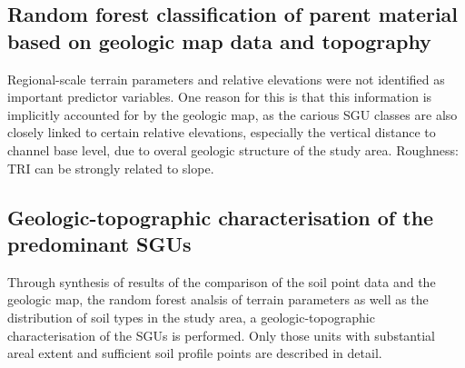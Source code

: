 \documentclass[preprint,12pt,authoryear]{elsarticle}
\begin{document}
\subsection{Random forest classification of parent material based on geologic map data and topography}
Regional-scale terrain parameters and relative elevations were not identified as important predictor variables. One reason for this is that this information is implicitly accounted for by the geologic map, as the carious SGU classes are also closely linked to certain relative elevations, especially the vertical distance to channel base level, due to overal geologic structure of the study area.
Roughness: TRI can be strongly related to slope.

\subsection{Geologic-topographic characterisation of the predominant SGUs}
Through synthesis of results of the comparison of the soil point data and the geologic map, the random forest analsis of terrain parameters as well as the distribution of soil types in the study area, a geologic-topographic characterisation of the  SGUs is performed. Only those units with substantial areal extent and sufficient soil profile points are described in detail.
\end{document}

